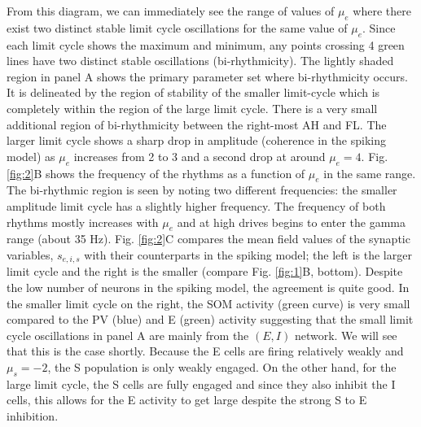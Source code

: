 \documentclass[10pt,letterpaper]{article}
\begin{document}
From this diagram, we can immediately see the range of values of $\mu_e$ where there exist two distinct stable limit cycle oscillations for the same value of $\mu_e$. Since each limit cycle shows the maximum and minimum, any points crossing 4 green lines have two distinct stable oscillations (bi-rhythmicity). The lightly shaded region in panel A shows the primary parameter set where bi-rhythmicity occurs. It is delineated by the region of stability of the smaller limit-cycle which is completely within the region of the large limit cycle.  There is a very small additional region of bi-rhythmicity between the right-most AH and FL.  The larger limit cycle shows a sharp drop in amplitude (coherence in the spiking model) as $\mu_e$ increases from 2 to 3 and a second drop at around $\mu_e=4$.   Fig. \ref{fig:2}B shows the frequency of the rhythms as a function of $\mu_e$ in the same range. The bi-rhythmic region is seen by noting two different frequencies: the smaller amplitude limit cycle has a slightly higher frequency.  The frequency of both rhythms mostly increases with $\mu_e$ and at high drives begins to enter the gamma range (about 35 Hz).  Fig. \ref{fig:2}C compares the mean field values of the synaptic variables, $s_{e,i,s}$ with their counterparts in the spiking model; the left is the larger limit cycle and the right is the smaller (compare Fig. \ref{fig:1}B, bottom). Despite the low number of neurons in the spiking model, the agreement is quite good.  In the smaller limit cycle on the right, the SOM activity (green curve) is very small compared to the PV (blue) and E (green) activity suggesting that the small limit cycle oscillations in panel A are mainly from the $(E,I)$ network. We will see that this is the case shortly.  Because the E cells are firing relatively weakly and $\mu_s=-2$, the S population is only weakly engaged. On the other hand, for the large limit cycle, the S cells are fully engaged and since they also inhibit the I cells, this allows for the E activity to get large despite the strong S to E inhibition.
\end{document}
